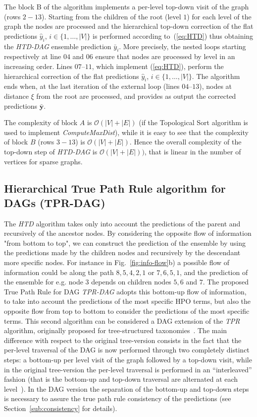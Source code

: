 \documentclass{bioinfo}
\newcommand{\by}{\boldsymbol{y}}
\begin{document}
\begin{methods}
The block B of the algorithm implements a per-level top-down visit of the graph (rows $2-13$). 
Starting from the children of the root (level $1$) for each level of the graph the nodes are processed and the hierarchical top-down correction of the flat predictions $\hat{y}_i$, $i \in \{1, \ldots, |V| \}$ is performed according to~(\ref{eq:HTD}) thus obtaining the {\em HTD-DAG} ensemble prediction  $\bar{y}_i$.
More precisely, the nested loops starting respectively at line $04$ and $06$ ensure that nodes are processed by level in an increasing order. Lines $07$--$11$, which implement (\ref{eq:HTD}), perform the hierarchical correction of the flat predictions $\hat{y}_i$, $i \in \{1, \ldots, |V| \}$.
The algorithm ends when, at the last iteration of the external loop (lines $04$--$13$),  nodes at distance $\xi$ from the root are processed, and provides as output the corrected predictions $\bar{\by}$.

The complexity of block $A$ is $\mathcal{O}(|V| + |E|)$ (if the Topological Sort algorithm is used to implement {\em ComputeMaxDist}),
while it is easy to see that the complexity of block $B$ (rows $3-13$) is $\mathcal{O}(|V|+|E|)$.
Hence the overall complexity of the top-down step of {\em HTD-DAG} is $\mathcal{O}(|V|+|E|))$, that is linear in the number of vertices for sparse graphs.


\subsection{Hierarchical True Path Rule algorithm for DAGs (TPR-DAG)}
\label{subsec:TPR}
The {\em HTD} algorithm takes only into account the predictions of the parent and recursively of the ancestor nodes. By considering the opposite flow of information "from bottom to top", we can construct the prediction of the ensemble by using the predictions made by the children  nodes and recursively by the descendant more specific nodes. For instance in Fig.~\ref{fig:info-flow}b) a possible flow of information could be along the path $8, 5, 4, 2, 1$ or $7, 6, 5, 1$, and the prediction of the ensemble for e.g. node $3$ depends on children nodes $5, 6$ and $7$. The proposed True Path Rule for DAG {\em TPR-DAG} adopts this bottom-up flow of information, to take into account the predictions of the most specific HPO terms, but also the opposite flow from top to bottom to consider the predictions of the most specific terms.
This second algorithm can be considered a DAG extension of the {\em TPR} algorithm, originally proposed for tree-structured taxonomies~\citep{Vale11a}.
The main difference with respect to the original tree-version consists in the fact that the per-level traversal of the DAG is now performed through two completely distinct steps: a bottom-up per level visit of the graph followed by a top-down visit, while in the original tree-version the per-level traversal is performed in an ``interleaved'' fashion (that is the bottom-up and top-down traversal are alternated at each level~\cite{Vale11a}). 
In the DAG version the separation of the bottom-up and top-down steps is necessary to assure the true path rule consistency of the predictions (see Section~\ref{sub:consistency} for details).



\end{methods}
\end{document}
